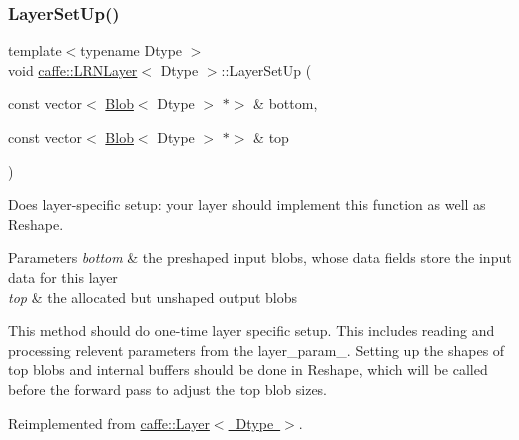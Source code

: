 \subsubsection{\texorpdfstring{Layer\+Set\+Up()}{LayerSetUp()}\hspace{0.1cm}{\footnotesize\ttfamily [2/2]}}
{\footnotesize\ttfamily template$<$typename Dtype $>$ \\
void \mbox{\hyperlink{classcaffe_1_1_l_r_n_layer}{caffe\+::\+L\+R\+N\+Layer}}$<$ Dtype $>$\+::Layer\+Set\+Up (\begin{DoxyParamCaption}\item[{const vector$<$ \mbox{\hyperlink{classcaffe_1_1_blob}{Blob}}$<$ Dtype $>$ $\ast$$>$ \&}]{bottom,  }\item[{const vector$<$ \mbox{\hyperlink{classcaffe_1_1_blob}{Blob}}$<$ Dtype $>$ $\ast$$>$ \&}]{top }\end{DoxyParamCaption})\hspace{0.3cm}{\ttfamily [virtual]}}



Does layer-\/specific setup\+: your layer should implement this function as well as Reshape. 


\begin{DoxyParams}{Parameters}
{\em bottom} & the preshaped input blobs, whose data fields store the input data for this layer \\
\hline
{\em top} & the allocated but unshaped output blobs\\
\hline
\end{DoxyParams}
This method should do one-\/time layer specific setup. This includes reading and processing relevent parameters from the {\ttfamily layer\+\_\+param\+\_\+}. Setting up the shapes of top blobs and internal buffers should be done in {\ttfamily Reshape}, which will be called before the forward pass to adjust the top blob sizes. 

Reimplemented from \mbox{\hyperlink{classcaffe_1_1_layer_a481323a3e0972c682787f2137468c29f}{caffe\+::\+Layer$<$ Dtype $>$}}.

\mbox{\label{classcaffe_1_1_l_r_n_layer_aa002dacb2f69d2b500227f938a957a81}} 
